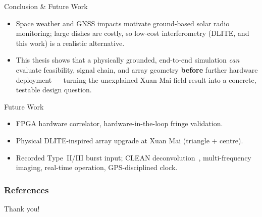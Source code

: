 \documentclass{beamer}
\newcounter{sframe}[section]
\renewcommand{\thesframe}{\thesection.\arabic{sframe}}
\newcommand{\ftitle}[1]{\stepcounter{sframe}{\normalsize\thesframe}\quad #1}
\begin{document}
\begin{frame}{\ftitle{Conclusion \& Future Work}}
\begin{itemize}
  \item Space weather and GNSS impacts motivate ground-based solar radio
  monitoring; large dishes are costly, so low-cost interferometry (DLITE,
  and this work) is a realistic alternative.
  \item This thesis shows that a physically grounded, end-to-end
  simulation \emph{can} evaluate feasibility, signal chain, and array
  geometry \textbf{before} further hardware deployment --- turning the
  unexplained Xuan Mai field result into a concrete, testable design
  question.
\end{itemize}
\begin{block}{Future Work}
\footnotesize
\begin{itemize}
  \item FPGA hardware correlator, hardware-in-the-loop fringe validation.
  \item Physical DLITE-inspired array upgrade at Xuan Mai (triangle + centre).
  \item Recorded Type~II/III burst input; CLEAN
  deconvolution~\cite{hogbom1974}, multi-frequency imaging, real-time
  operation, GPS-disciplined clock.
\end{itemize}
\end{block}
\end{frame}

\begin{frame}[allowframebreaks]
\frametitle{References}
\tiny{

}
\end{frame}

\begin{frame}
\Huge{\centerline{Thank you!}}
\end{frame}
\end{document}
